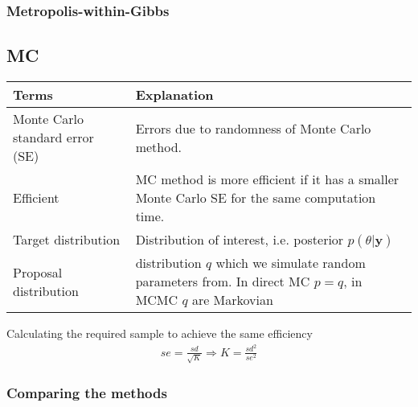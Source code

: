       \subsubsection{Metropolis-within-Gibbs}

      \subsection{MC}

      \begin{tabulary}{\linewidth}{l L}
          \hline
          Terms & Explanation\\
          \hline
          \hline
          Monte Carlo standard error (SE)
                & Errors due to randomness of Monte Carlo
                method.\\
          Efficient
                & MC method is more efficient if it has a
                smaller Monte Carlo SE for the same
                computation time.\\
          Target distribution
                & Distribution of interest, i.e. posterior
                $p(\theta|\mathbf{y})$\\
          Proposal distribution
                & distribution $q$ which we simulate random
                parameters from. In direct MC $p=q$, in MCMC
                $q$ are Markovian
      \end{tabulary}

      Calculating the required sample to achieve the same
      efficiency
      \begin{align*}
          se = \frac{sd}{\sqrt{K}} \Rightarrow K = \frac{sd^2}{se^2}
      \end{align*}

      \subsubsection{Comparing the methods}

